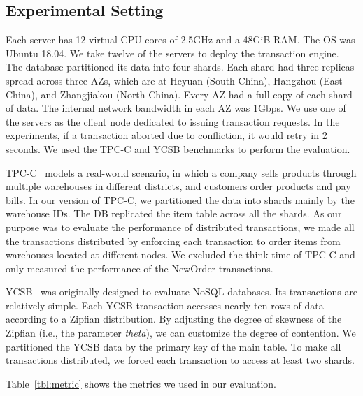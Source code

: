 \documentclass[conference]{IEEEtran}
\begin{document}
\subsection{Experimental Setting}
\label{subsec:exp_setting}
Each server has 12 virtual CPU cores of 2.5GHz and a 48GiB RAM.
The OS was Ubuntu 18.04.
We take twelve of the servers to deploy the transaction engine.
The database partitioned its data into four shards.
Each shard had three replicas spread across three AZs,
which are at Heyuan (South China), Hangzhou (East China), and Zhangjiakou (North China).
Every AZ had a full copy of each shard of data.
The internal network bandwidth in each AZ was 1Gbps.
We use one of the servers as the client node dedicated to issuing transaction requests.
In the experiments, if a transaction aborted due to confliction, it would retry in 2 seconds.
We used the TPC-C and YCSB benchmarks to perform the evaluation.


TPC-C~\cite{TPCC:conf/tpctc/NambiarWMTLCM11} models a real-world scenario, in which a company sells products through multiple warehouses in different districts, and customers order products and pay bills.
In our version of TPC-C, we partitioned the data into shards mainly by the warehouse IDs.
The DB replicated the item table across all the shards.
As our purpose was to evaluate the performance of distributed transactions,
we made all the transactions distributed by enforcing each transaction to order items from warehouses located at different nodes.
We excluded the think time of TPC-C and only measured the performance of the NewOrder transactions.


YCSB~\cite{YCSB:conf/cloud/CooperSTRS10} was originally designed to evaluate NoSQL databases.
Its transactions are relatively simple.
Each YCSB transaction accesses nearly ten rows of data according to a Zipfian distribution.
By adjusting the degree of skewness of the Zipfian (i.e., the parameter \emph{theta}), we can customize the degree of contention.
We partitioned the YCSB data by the primary key of the main table.
To make all transactions distributed, we forced each transaction to access at least two shards.

Table~\ref{tbl:metric} shows the metrics we used in our evaluation.
\end{document}
